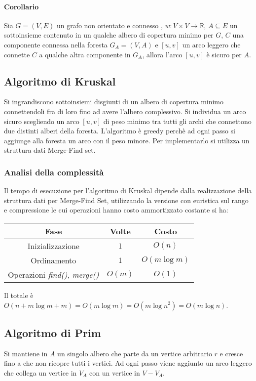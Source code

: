 \paragraph{Corollario}
Sia $G=(V, E)$ un grafo non orientato e connesso , $w:V\times V\rightarrow\mathbb{R}$, $A\subseteq E$ un sottoinsieme contenuto in un qualche albero di copertura minimo per $G$, $C$
una componente connessa nella foresta $G_A=(V, A)$ e $[u, v]$ un arco leggero che connette $C$ a qualche altra componente in $G_A$, allora l'arco $[u, v]$ \`e sicuro per $A$. 
\subsection{Algoritmo di Kruskal}
Si ingrandiscono sottoinsiemi disgiunti di un albero di copertura minimo connettendoli fra di loro fino ad avere l'albero complessivo. Si individua un arco sicuro scegliendo un arco
$[u, v]$ di peso minimo tra tutti gli archi che connettono due distinti alberi della foresta. L'algoritmo \`e greedy perch\`e ad ogni passo si aggiunge alla foresta un arco con il peso
minore. Per implementarlo si utilizza un struttura dati Merge-Find set.\\

\subsubsection{Analisi della complessit\`a}
Il tempo di esecuzione per l'algoritmo di Kruskal dipende dalla realizzazione della struttura dati per Merge-Find Set, utilizzando la versione con euristica sul rango e compressione le
cui operazioni hanno costo ammortizzato costante si ha:
\begin{center}
\begin{tabular}{|c|c|c|}
	\hline
	\textbf{Fase} & \textbf{Volte} & \textbf{Costo} \\
	\hline
	Inizializzazione & $1$ & $O(n)$ \\
	\hline
	Ordinamento & $1$ & $O(m\log m)$ \\
	\hline
	Operazioni \emph{find()}, \emph{merge()} & $O(m)$ & $O(1)$\\
	\hline
\end{tabular}
\end{center}
Il totale \`e $O(n+m\log m + m) = O(m\log m) = O(m\log n^2) = O(m\log n)$.
\subsection{Algoritmo di Prim}
Si mantiene in $A$ un singolo albero che parte da un vertice arbitrario $r$ e cresce fino a che non ricopre tutti i vertici. Ad ogni passo viene aggiunto un arco leggero che collega
un vertice in $V_A$ con un vertice in $V-V_A$.
